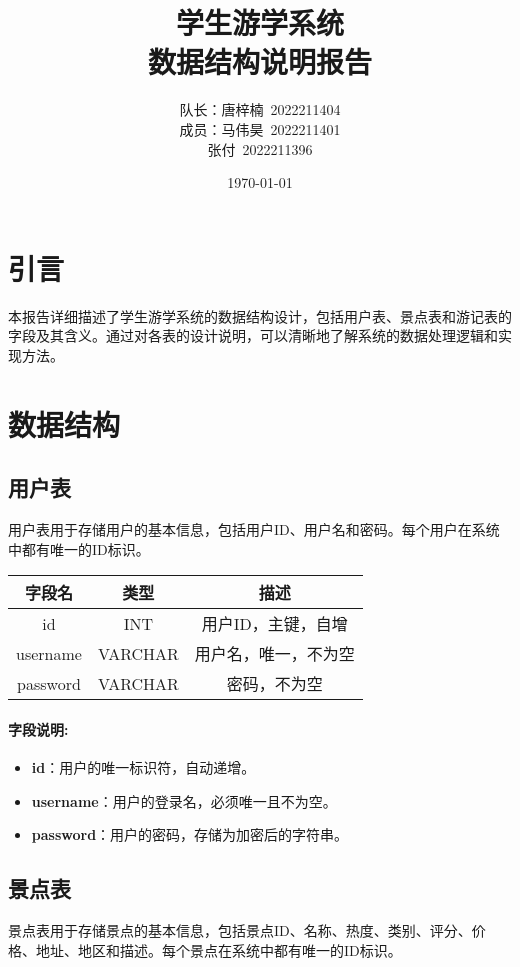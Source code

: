 \documentclass{ctexart}
\title{学生游学系统 \\ 数据结构说明报告}
\author{队长：唐梓楠\ 2022211404 \\ 成员：马伟昊\ 2022211401 \\ 张付\ 2022211396}
\date{\today}
\begin{document}
\maketitle

\tableofcontents

\newpage

\section{引言}
本报告详细描述了学生游学系统的数据结构设计，包括用户表、景点表和游记表的字段及其含义。通过对各表的设计说明，可以清晰地了解系统的数据处理逻辑和实现方法。

\section{数据结构}

\subsection{用户表}
用户表用于存储用户的基本信息，包括用户ID、用户名和密码。每个用户在系统中都有唯一的ID标识。

\begin{center}
    \begin{tabular}{ccc}
        \toprule
        字段名      & 类型      & 描述         \\
        \midrule
        id       & INT     & 用户ID，主键，自增 \\
        username & VARCHAR & 用户名，唯一，不为空 \\
        password & VARCHAR & 密码，不为空     \\
        \bottomrule
    \end{tabular}
\end{center}

\paragraph{字段说明:}
\begin{itemize}
    \item \textbf{id}：用户的唯一标识符，自动递增。
    \item \textbf{username}：用户的登录名，必须唯一且不为空。
    \item \textbf{password}：用户的密码，存储为加密后的字符串。
\end{itemize}

\subsection{景点表}
景点表用于存储景点的基本信息，包括景点ID、名称、热度、类别、评分、价格、地址、地区和描述。每个景点在系统中都有唯一的ID标识。
\end{document}
